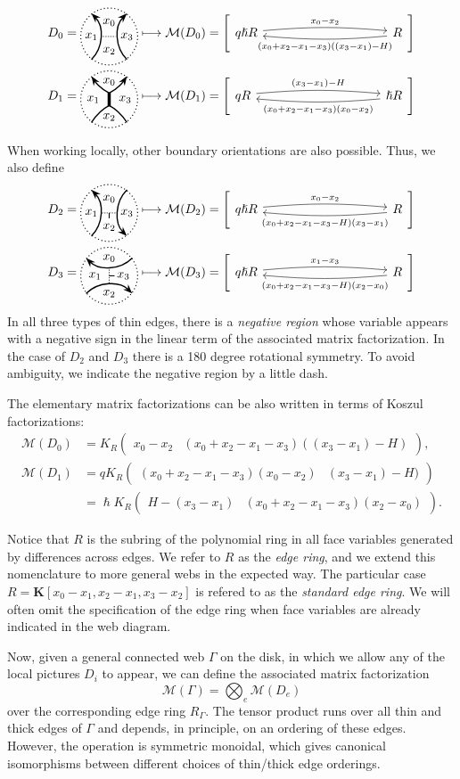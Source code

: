 \documentclass{article}
\newcommand{\maf}{\mathcal{M}}
\newcommand{\mf}[4]{%
  \begin{tikzcd}[column sep=3.5cm, ampersand replacement=\&]
    {#1} \arrow[r, "#3", shift left=0.5ex, bend left=5,start anchor=east, end anchor=west] \arrow[r, leftarrow, "#4", shift right=0.5ex, bend right=5, swap, start anchor=east, end anchor=west] \& 
    {#2}
  \end{tikzcd}%
}
\newcommand{\kmf}[2]{
	K_{#1}{\begin{pmatrix}
			#2
		\end{pmatrix}
	}	
}
\theoremstyle{plain} %
\theoremstyle{definition} %
\theoremstyle{remark} %
\begin{document}
\begin{align*}
	D_0=\ThinEdgeStandard 
	&\longmapsto \maf(D_0)=\left[\mf{q\hslash R}{ R}{x_0-x_2}{(x_0+x_2-x_1-x_3)((x_3-x_1)-H)}\right]
	\\
	D_1=\ThickEdgeStandard 
	&\longmapsto \maf(D_1)=\left[\mf{q R}{\hslash R}{(x_3-x_1)-H}{(x_0+x_2-x_1-x_3)(x_0-x_2)}\right]
\end{align*}

When working locally, other boundary orientations are also possible. Thus, we also define
\begin{align*}
	D_2=\UnorientedHorizontalThinEdgeStandard 
	&
	\longmapsto \maf(D_2)=\left[\mf{q\hslash R}{ R}{x_0-x_2}{(x_0+x_2-x_1-x_3-H)(x_3-x_1)}\right]
	\\
	D_3=\UnorientedVerticalThinEdgeStandard 
	&
	\longmapsto \maf(D_3)=\left[\mf{q\hslash R}{ R}{x_1-x_3}{(x_0+x_2-x_1-x_3-H)(x_2-x_0)}\right]
\end{align*}
In all three types of thin edges, there is a \emph{negative region} whose variable appears with a negative sign in the linear term of the associated matrix factorization. In the case of $D_2$ and $D_3$ there is a 180 degree rotational symmetry. To avoid ambiguity, we indicate the negative region by a little dash.



The elementary matrix factorizations can be also written in terms of Koszul factorizations:
\begin{align*}
	\maf(D_0)
	&
	=K_R {\begin{pmatrix}
				x_0-x_2 &(x_0+x_2-x_1-x_3)((x_3-x_1)-H)
		\end{pmatrix}}
	,	
	\\
	\maf(D_1)    
	&
	= q\kmf{R}{(x_0+x_2-x_1-x_3)(x_0-x_2)& (x_3-x_1)-H)}	
	\\
	&
	=\hslash \kmf{R}{H-(x_3-x_1)&(x_0+x_2-x_1-x_3)(x_2-x_0)}
	.
\end{align*}

Notice that $R$ is the subring of the polynomial ring in all face variables generated by differences across edges. We refer to $R$ as the \emph{edge ring}, and we extend this nomenclature to more general webs in the expected way. The particular case $R=\mathbf K[x_0-x_1,x_2-x_1,x_3-x_2]$ is refered to as the \emph{standard edge ring}. We will often omit the specification of the edge ring when face variables are already indicated in the web diagram.

Now, given a general connected web $\Gamma$ on the disk, in which we allow any of the local pictures $D_i$ to appear, we can define the associated matrix factorization
$$
	\maf(\Gamma) =\bigotimes_e\maf(D_e)
$$
over the corresponding edge ring $R_\Gamma$. The tensor product runs over all thin and thick edges of $\Gamma$ and depends, in principle, on an ordering of these edges. However, the operation is symmetric monoidal, which gives canonical isomorphisms between different choices of thin/thick edge orderings.
\end{document}
